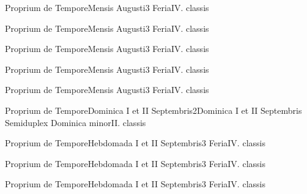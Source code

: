 \documentclass[liber-responsorialis_temporale.tex]{subfiles}
\begin{document}
	{Proprium de Tempore}{Mensis Augusti}{3}{}
	{Feria}{IV. classis}{}
	{}
	{}
\vspace{2\baselineskip}
\pagebreak

	{Proprium de Tempore}{Mensis Augusti}{3}{}
	{Feria}{IV. classis}{}
	{}
	{}

	{Proprium de Tempore}{Mensis Augusti}{3}{}
	{Feria}{IV. classis}{}
	{}
	{}

	{Proprium de Tempore}{Mensis Augusti}{3}{}
	{Feria}{IV. classis}{}
	{}
	{}

	{Proprium de Tempore}{Mensis Augusti}{3}{}
	{Feria}{IV. classis}{}
	{}
	{}

\newpage

\sixlinesvspace
{}
	{Proprium de Tempore}{Dominica I et II Septembris}{2}{Dominica I et II Septembris}
	{Semiduplex Dominica minor}{II. classis}{}
	{}
	{}
\thispagestyle{empty}
\sixlinesvspace
{}
\pagebreak
\fiveplustitlevspace
\fiveplustitlevspace
{}
\sixlinesvspace
{}

\vspace{2\baselineskip}
\pagebreak

	{Proprium de Tempore}{Hebdomada I et II Septembris}{3}{}
	{Feria}{IV. classis}{}
	{}
	{}
\vspace{\baselineskip}

	{Proprium de Tempore}{Hebdomada I et II Septembris}{3}{}
	{Feria}{IV. classis}{}
	{}
	{}

	{Proprium de Tempore}{Hebdomada I et II Septembris}{3}{}
	{Feria}{IV. classis}{}
	{}
	{}
\end{document}
